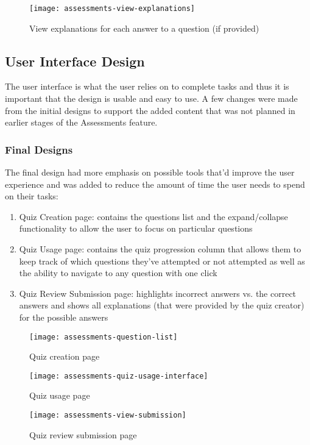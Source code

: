 \begin{figure}[h!]
	\centering
	\texttt{[image: assessments-view-explanations]}
	\caption{View explanations for each answer to a question (if provided)}
\end{figure}


\subsection{User Interface Design}
The user interface is what the user relies on to complete tasks and thus it is important that the design is usable and easy to use. A few changes were made from the initial designs to support the added content that was not planned in earlier stages of the Assessments feature.

\subsubsection{Final Designs}
The final design had more emphasis on possible tools that'd improve the user experience and was added to reduce the amount of time the user needs to spend on their tasks: 

\begin{enumerate}
	\item Quiz Creation page: contains the questions list and the expand/collapse functionality to allow the user to focus on particular questions
	\item Quiz Usage page: contains the quiz progression column that allows them to keep track of which questions they've attempted or not attempted as well as the ability to navigate to any question with one click
	\item Quiz Review Submission page: highlights incorrect answers vs. the correct answers and shows all explanations (that were provided by the quiz creator) for the possible answers
\end{enumerate}

\begin{figure}[h!]
	\centering
	\texttt{[image: assessments-question-list]}
	\caption{Quiz creation page}
\end{figure}

\begin{figure}[h!]
	\centering
	\texttt{[image: assessments-quiz-usage-interface]}
	\caption{Quiz usage page}
\end{figure}

\begin{figure}[h!]
	\centering
	\texttt{[image: assessments-view-submission]}
	\caption{Quiz review submission page}
\end{figure}


